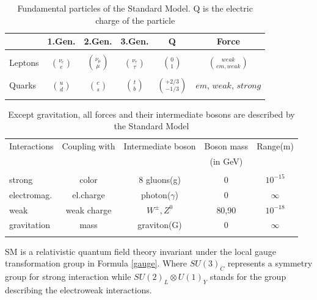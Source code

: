 \documentclass[12pt,oneandhalf,chaparabic,phys,ms,eng]{metu}
\begin{document}
\begin{table}[!hbt]
\caption{Fundamental particles of the Standard Model. Q is the electric charge of the particle}
\label{SMPar}
\begin{center}
\begin{tabular}{l c c c c c} %
		 & 1.Gen. & 2.Gen. & 3.Gen. & Q & Force\\ \hline
\\
 Leptons    & { $ \nu_{e} \choose e$ } & { $ \nu_{\mu} \choose \mu$ } & { $ \nu_{\tau} \choose \tau$ } & { $ 0 \choose 1$ } &{ $ weak \choose em,weak$ }  \\ %
\\
	Quarks & { $u \choose d$ } & { $c \choose s$ } & { $ t \choose b$ } & { $ +2/3 \choose -1/3$ } & $em$, $weak$, $strong$ \\

\\ %
\end{tabular}
\end{center}
\end{table}



\begin{table} [!hbt]
\caption{Except gravitation, all forces and their intermediate bosons are described by the Standard Model}
\label{SMFor}
\begin{center}
\begin{tabular}{l c c c c } %
		 Interactions & Coupling with & Intermediate boson & Boson mass & Range(m)\\
&&&(in GeV)& \\ \hline
\\
 strong & color & 8 gluons(g) & 0 & $10^{-15}$ \\ 
electromag. & el.charge & photon($\gamma$) & 0 & $\infty$ \\
weak&weak charge&$W^\pm , Z^0$ & 80,90 & $10^{-18}$ \\
gravitation&mass&graviton(G)&0&$\infty$\\
\\ 
\end{tabular}
\end{center}
\end{table}


SM is a relativistic quantum field theory invariant under the local gauge transformation group in Formula \ref{gauge}.
Where $SU(3)_{C} $ represents a symmetry group for strong interaction while $SU(2)_{L} \otimes U(1)_{Y}$ stands for the group describing the electroweak interactions. 
 
\end{document}
